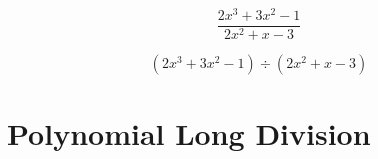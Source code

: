 
\vfill
\begin{tcbraster}[
    raster columns = 2,
    raster equal height,
    raster valign = center,
    raster column skip = 1in,
    raster left skip=0.1in, raster right skip=0.1in,
    colback=white,
    ]
    \begin{tcolorbox}
        \Large
        \begin{equation*}
            \frac{2x^3 + 3x^2 - 1}{2x^2 + x - 3}
        \end{equation*}
    \end{tcolorbox}
    \begin{tcolorbox}
        \Large
        \begin{equation*}
            (2x^3 + 3x^2 - 1) \div (2x^2 + x - 3)
        \end{equation*}
    \end{tcolorbox}
\end{tcbraster}
\vfill

\newpage
\section{Polynomial Long Division}

